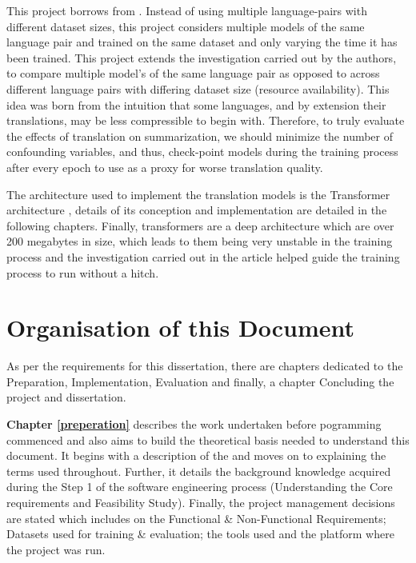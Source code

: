 \documentclass[12pt,a4paper,twoside,openright]{report}
\begin{document}
This project borrows from \cite{nguyen-daume-iii-2019-global}. Instead of using multiple language-pairs with different dataset sizes, this project considers multiple models of the same language pair and trained on the same dataset and only varying the time it has been trained. This project extends the investigation carried out by the authors, to compare multiple model's of the same language pair as opposed to across different language pairs with differing dataset size (resource availability). This idea was born from the intuition that some languages, and by extension their translations, may be less compressible to begin with. Therefore, to truly evaluate the effects of translation on summarization, we should minimize the number of confounding variables, and thus, check-point models during the training process after every epoch to use as a proxy for worse translation quality. 

The architecture used to implement the translation models is the Transformer architecture \cite{transformers}, details of its conception and implementation are detailed in the following chapters. Finally, transformers are a deep architecture which are over 200 megabytes in size, which leads to them being very unstable in the training process and the investigation carried out in the article \cite{training-tips} helped guide the training process to run without a hitch. 

\section{Organisation of this Document}
\label{doc-org}
As per the requirements for this dissertation, there are chapters dedicated to the Preparation, Implementation, Evaluation and finally, a chapter Concluding the project and dissertation. 

\textbf{Chapter \ref{preperation}  }describes the work undertaken before pogramming commenced and also aims to build the theoretical basis needed to understand this document. It begins with a description of the  and moves on to explaining the terms used throughout. Further, it details the background knowledge acquired during the Step 1 of the software engineering process (Understanding the Core requirements and Feasibility Study). Finally, the project management decisions are stated which includes on the Functional \& Non-Functional Requirements; Datasets used for training \& evaluation; the tools used and the platform where the project was run. 
\end{document}
